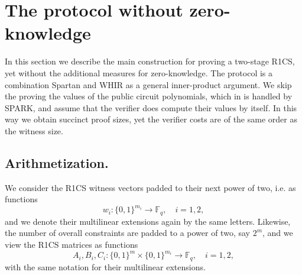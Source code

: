 \section{The protocol without zero-knowledge}
\label{s:protocol:no:zk}

In this section we describe the main construction for proving a two-stage R1CS, yet without the additional measures for zero-knowledge.
The protocol is a combination Spartan \cite{Spartan} and WHIR \cite{WHIR} as a general inner-product argument. 
We skip the proving the values of the public circuit polynomials, which in \cite{Spartan} is handled by SPARK, and assume that the verifier does compute their values by itself.
In this way we obtain succinct proof sizes, yet the verifier costs are of the same order as the witness size.




\subsection{Arithmetization.}
We consider the R1CS witness vectors padded to their next power of two, i.e. as functions
\[
w_i: \{0,1\}^{m_i} \longrightarrow \mathbb F_q, \quad i=1,2,
\]
and we denote their multilinear extensions again by the same letters.
Likewise, the number of overall constraints are padded to a power of two, say $2^m$, and we view the R1CS matrices as functions
\[
A_i, B_i, C_i: \{0,1\}^m \times \{0,1\}^{m_i} \longrightarrow \mathbb F_q, \quad i =1,2, 
\]
with the same notation for their multilinear extensions. 

